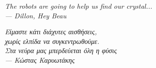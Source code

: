 \thispagestyle{empty}
\mbox{}
\begin{flushright}

{\selectfont
  \vspace{6cm}

  \it{
    The robots are going to help us find our crystal...
  }
  \\
  --- \textup{Dillon}, \textit{Hey Beau}

  \vspace{3cm}

  \it{Είμαστε κάτι διάχυτες αισθήσεις, \\
      χωρίς ελπίδα να συγκεντρωθούμε. \\
      Στα νεύρα μας μπερδεύεται όλη η φύσις
  }
  \\
  --- \textup{Κώστας Καρυωτάκης}
}
\end{flushright}
